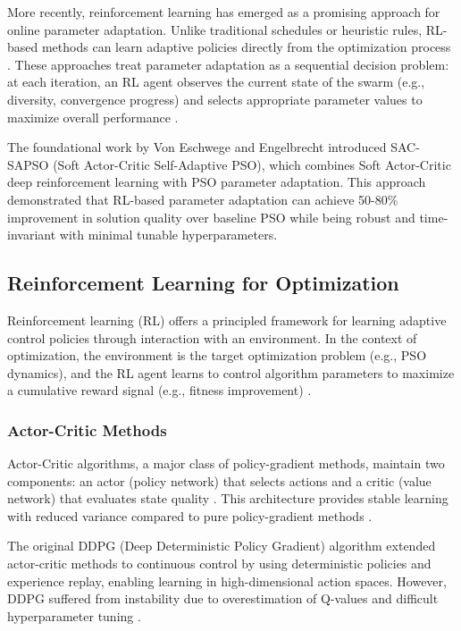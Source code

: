 More recently, reinforcement learning has emerged as a promising approach for online parameter adaptation. Unlike traditional schedules or heuristic rules, RL-based methods can learn adaptive policies directly from the optimization process \cite{Zhang2023RL}. These approaches treat parameter adaptation as a sequential decision problem: at each iteration, an RL agent observes the current state of the swarm (e.g., diversity, convergence progress) and selects appropriate parameter values to maximize overall performance \cite{Engelbrecht2023}.

The foundational work by Von Eschwege and Engelbrecht \cite{VonEschwege2024} introduced SAC-SAPSO (Soft Actor-Critic Self-Adaptive PSO), which combines Soft Actor-Critic deep reinforcement learning with PSO parameter adaptation. This approach demonstrated that RL-based parameter adaptation can achieve 50-80\% improvement in solution quality over baseline PSO while being robust and time-invariant with minimal tunable hyperparameters.

\subsection*{Reinforcement Learning for Optimization}
\label{subsec:reinforcement_learning}

Reinforcement learning (RL) offers a principled framework for learning adaptive control policies through interaction with an environment. In the context of optimization, the environment is the target optimization problem (e.g., PSO dynamics), and the RL agent learns to control algorithm parameters to maximize a cumulative reward signal (e.g., fitness improvement) \cite{Haarnoja2018, Lillicrap2015}.

\subsubsection*{Actor-Critic Methods}

Actor-Critic algorithms, a major class of policy-gradient methods, maintain two components: an actor (policy network) that selects actions and a critic (value network) that evaluates state quality \cite{Konda2000, Mnih2016}. This architecture provides stable learning with reduced variance compared to pure policy-gradient methods \cite{Schulman2016}.

The original DDPG (Deep Deterministic Policy Gradient) algorithm \cite{Lillicrap2015} extended actor-critic methods to continuous control by using deterministic policies and experience replay, enabling learning in high-dimensional action spaces. However, DDPG suffered from instability due to overestimation of Q-values and difficult hyperparameter tuning \cite{Fujimoto2018}.

